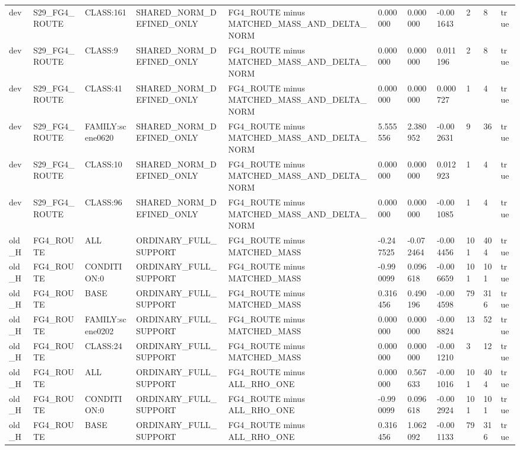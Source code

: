 \begin{tabular}{lllllllllll}
dev & S29\_FG4\_ROUTE & CLASS:161 & SHARED\_NORM\_DEFINED\_ONLY & FG4\_ROUTE minus MATCHED\_MASS\_AND\_DELTA\_NORM & 0.000000 & 0.000000 & -0.001643 & 2 & 8 & true \\
dev & S29\_FG4\_ROUTE & CLASS:9 & SHARED\_NORM\_DEFINED\_ONLY & FG4\_ROUTE minus MATCHED\_MASS\_AND\_DELTA\_NORM & 0.000000 & 0.000000 & 0.011196 & 2 & 8 & true \\
dev & S29\_FG4\_ROUTE & CLASS:41 & SHARED\_NORM\_DEFINED\_ONLY & FG4\_ROUTE minus MATCHED\_MASS\_AND\_DELTA\_NORM & 0.000000 & 0.000000 & 0.000727 & 1 & 4 & true \\
dev & S29\_FG4\_ROUTE & FAMILY:scene0620 & SHARED\_NORM\_DEFINED\_ONLY & FG4\_ROUTE minus MATCHED\_MASS\_AND\_DELTA\_NORM & 5.555556 & 2.380952 & -0.002631 & 9 & 36 & true \\
dev & S29\_FG4\_ROUTE & CLASS:10 & SHARED\_NORM\_DEFINED\_ONLY & FG4\_ROUTE minus MATCHED\_MASS\_AND\_DELTA\_NORM & 0.000000 & 0.000000 & 0.012923 & 1 & 4 & true \\
dev & S29\_FG4\_ROUTE & CLASS:96 & SHARED\_NORM\_DEFINED\_ONLY & FG4\_ROUTE minus MATCHED\_MASS\_AND\_DELTA\_NORM & 0.000000 & 0.000000 & -0.001085 & 1 & 4 & true \\
old\_H & FG4\_ROUTE & ALL & ORDINARY\_FULL\_SUPPORT & FG4\_ROUTE minus MATCHED\_MASS & -0.247525 & -0.072464 & -0.004456 & 101 & 404 & true \\
old\_H & FG4\_ROUTE & CONDITION:0 & ORDINARY\_FULL\_SUPPORT & FG4\_ROUTE minus MATCHED\_MASS & -0.990099 & 0.096618 & -0.006659 & 101 & 101 & true \\
old\_H & FG4\_ROUTE & BASE & ORDINARY\_FULL\_SUPPORT & FG4\_ROUTE minus MATCHED\_MASS & 0.316456 & 0.490196 & -0.004598 & 79 & 316 & true \\
old\_H & FG4\_ROUTE & FAMILY:scene0202 & ORDINARY\_FULL\_SUPPORT & FG4\_ROUTE minus MATCHED\_MASS & 0.000000 & 0.000000 & -0.008824 & 13 & 52 & true \\
old\_H & FG4\_ROUTE & CLASS:24 & ORDINARY\_FULL\_SUPPORT & FG4\_ROUTE minus MATCHED\_MASS & 0.000000 & 0.000000 & -0.001210 & 3 & 12 & true \\
old\_H & FG4\_ROUTE & ALL & ORDINARY\_FULL\_SUPPORT & FG4\_ROUTE minus ALL\_RHO\_ONE & 0.000000 & 0.567633 & -0.001016 & 101 & 404 & true \\
old\_H & FG4\_ROUTE & CONDITION:0 & ORDINARY\_FULL\_SUPPORT & FG4\_ROUTE minus ALL\_RHO\_ONE & -0.990099 & 0.096618 & -0.002924 & 101 & 101 & true \\
old\_H & FG4\_ROUTE & BASE & ORDINARY\_FULL\_SUPPORT & FG4\_ROUTE minus ALL\_RHO\_ONE & 0.316456 & 1.062092 & -0.001133 & 79 & 316 & true \\

\end{tabular}
